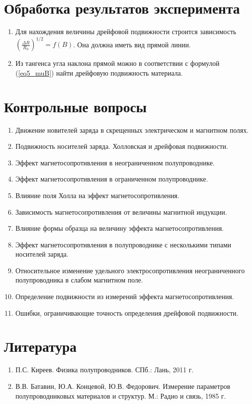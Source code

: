 \section{Обработка результатов эксперимента}
\begin{enumerate}
\item Для нахождения величины дрейфовой подвижности строится зависимость $\left( \frac{\Delta R}{R_{0}} \right)^{1/2} = f(B)$. Она должна иметь вид прямой линии.
\item Из тангенса угла наклона прямой можно в соответствии с формулой (\ref{eq5_muB}) найти дрейфовую подвижность материала.
\end{enumerate}

\section{Контрольные вопросы}
\begin{enumerate}
\item Движение новителей заряда в скрещенных электрическом и магнитном полях.
\item Подвижность носителей заряда. Холловская и дрейфовая подвижности.
\item Эффект магнетосопротивления в неограниченном полупроводнике.
\item Эффект магнетосопротивления в ограниченном полупроводнике.
\item Влияние поля Холла на эффект магнетосопротивления.
\item Зависимость магнетосопротивления от величины магнитной индукции.
\item Влияние формы образца на величину эффекта магнетосопротивления.
\item Эффект магнетосопротивления в полупроводнике с несколькими типами носителей заряда.
\item Относительное изменение удельного электросопротивления неограниченного полупроводника в слабом магнитном поле.
\item Определение подвижности из измерений эффекта магнетосопротивления.
\item Ошибки, ограничивающие точность определения дрейфовой подвижности.
\end{enumerate}

\section{Литература}
\begin{enumerate}
\item П.С. Киреев. Физика полупроводников. СПб.: Лань, 2011 г.
\item В.В. Батавин, Ю.А. Концевой, Ю.В. Федорович. Измерение параметров полупроводниковых материалов и структур. М.: Радио и связь, 1985 г.
\end{enumerate}